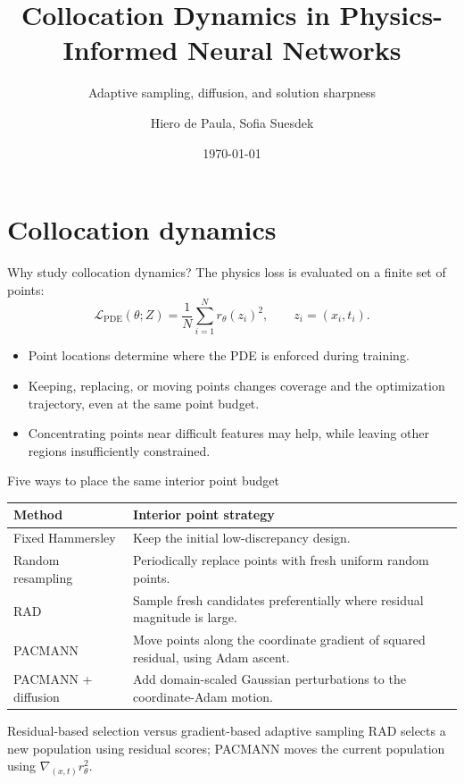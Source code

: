 \documentclass[aspectratio=169,11pt]{beamer}
\title[PINN collocation]{Collocation Dynamics in Physics-Informed Neural Networks}
\subtitle{Adaptive sampling, diffusion, and solution sharpness}
\author{Hiero de Paula, Sofia Suesdek}
\institute{Escola Politécnica da Universidade de São Paulo}
\date{\today}
\begin{document}
\begin{frame}[plain]
  \titlepage
\end{frame}

\section{Collocation dynamics}

\begin{frame}{Why study collocation dynamics?}
  The physics loss is evaluated on a finite set of points:
  \[
    \mathcal{L}_{\mathrm{PDE}}(\theta;Z)
      = \frac{1}{N}\sum_{i=1}^{N}r_\theta(z_i)^2,
      \qquad z_i=(x_i,t_i).
  \]
  \begin{itemize}
    \item Point locations determine where the PDE is enforced during training.
    \item Keeping, replacing, or moving points changes coverage and the
      optimization trajectory, even at the same point budget.
    \item Concentrating points near difficult features may help, while leaving
      other regions insufficiently constrained.
  \end{itemize}
\end{frame}

\begin{frame}{Five ways to place the same interior point budget}
  \small
  \begin{tabular}{@{}p{}p{}@{}}
    \toprule
    Method & Interior point strategy \\
    \midrule
    Fixed Hammersley & Keep the initial low-discrepancy design. \\
    Random resampling & Periodically replace points with fresh uniform random points. \\
    RAD\textsuperscript{\cite{rad}} & Sample fresh candidates preferentially where residual magnitude is large. \\
    PACMANN\textsuperscript{\cite{pacmann}} & Move points along the coordinate gradient of squared residual,
      using Adam ascent. \\
    PACMANN + diffusion & Add domain-scaled Gaussian perturbations to the
      coordinate-Adam motion. \\
    \bottomrule
  \end{tabular}
  \begin{block}{Residual-based selection versus gradient-based adaptive sampling}
    RAD selects a new population using residual scores; PACMANN moves the
    current population using $\nabla_{(x,t)}r_\theta^2$.
  \end{block}
\end{frame}
\end{document}
